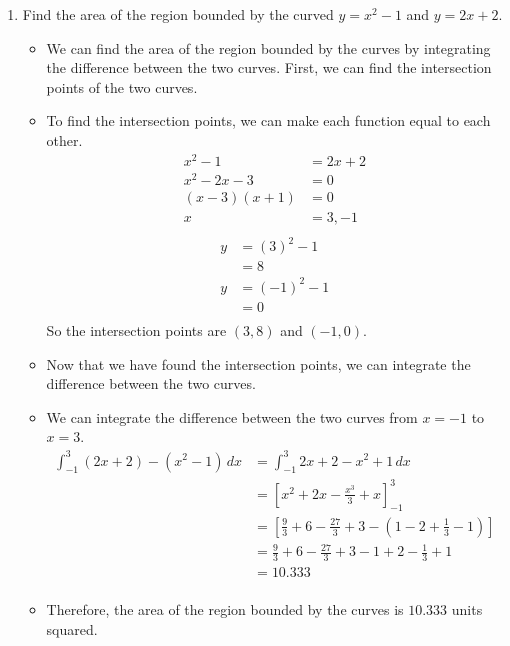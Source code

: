 \documentclass[12pt]{article}
\begin{document}
\begin{enumerate}[leftmargin=\labelsep]
    \item Find the area of the region bounded by the curved $y=x^2-1$ and $y=2x+2$.
    \begin{itemize}[label={}]
        \item We can find the area of the region bounded by the curves by integrating the difference between the two curves. First, we can find the intersection points of the two curves.
        \item To find the intersection points, we can make each function equal to each other.
        \begin{equation*}
            \begin{split}
                x^2-1 &= 2x+2 \\
                x^2-2x-3 &= 0 \\
                (x-3)(x+1) &= 0 \\
                x &= 3, -1 \\
            \end{split}
        \end{equation*}
        \begin{equation*}
            \begin{split}
                y &= (3)^2-1 \\
                &= 8 \\
                y &= (-1)^2-1 \\
                &= 0 \\
            \end{split}
        \end{equation*}
        So the intersection points are $(3,8)$ and $(-1,0)$.
        \item Now that we have found the intersection points, we can integrate the difference between the two curves.
        \item We can integrate the difference between the two curves from $x=-1$ to $x=3$.
        \begin{equation*}
            \begin{split}
                \int_{-1}^{3} (2x+2)-(x^2-1) \, dx &= \int_{-1}^{3} 2x+2-x^2+1 \, dx \\
                &= \left[ x^2 + 2x - \frac{x^3}{3} + x \right]_{-1}^{3} \\
                &= \left[ \frac{9}{3} + 6 - \frac{27}{3} + 3 - \left( 1 - 2 + \frac{1}{3} - 1 \right) \right] \\
                &= \frac{9}{3} + 6 - \frac{27}{3} + 3 - 1 + 2 - \frac{1}{3} + 1 \\
                &= 10.333 \\
            \end{split}
        \end{equation*}
        \item Therefore, the area of the region bounded by the curves is $10.333$ units squared.
    \end{itemize}


\end{enumerate}
\end{document}
